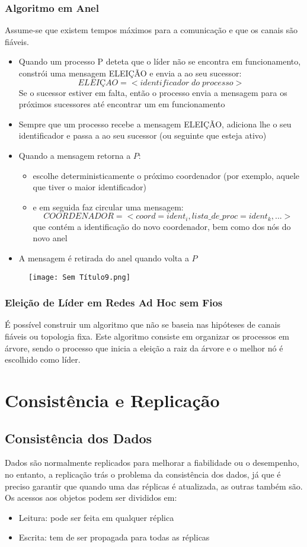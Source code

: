 \documentclass[10pt,a4paper]{report}
\begin{document}
\subsection{Algoritmo em Anel}
Assume-se que existem tempos máximos para a comunicação e que os canais são fiáveis.
\begin{itemize}
\item Quando um processo P deteta que o líder não se encontra em funcionamento, constrói uma mensagem ELEIÇÃO e envia a ao seu sucessor:
$$
ELEIÇAO = < identificador\;do\;processo >
$$
Se o sucessor estiver em falta, então o processo envia a mensagem para os próximos sucessores até encontrar um em funcionamento
\item Sempre que um processo recebe a mensagem ELEIÇÃO, adiciona lhe o seu identificador e passa a ao seu sucessor (ou seguinte que esteja ativo)
\item Quando a mensagem retorna a $P$:
\begin{itemize}
\item escolhe deterministicamente o próximo coordenador (por exemplo, aquele que tiver o maior identificador)
\item e em seguida faz circular uma mensagem:
$$
COORDENADOR = <coord=ident_i, lista\_de\_proc = ident_k,...>
$$
que contém a identificação do novo coordenador, bem como dos nós do novo anel
\end{itemize}
\item A mensagem é retirada do anel quando volta a $P$
\end{itemize}
\begin{figure}[H]
\centering
\texttt{[image: Sem Título9.png]}
\end{figure}
\subsection{Eleição de Líder em Redes Ad Hoc sem Fios}
É possível construir um algoritmo que não se baseia nas hipóteses de canais fiáveis ou topologia fixa. Este algoritmo consiste em organizar os processos em árvore, sendo o processo que inicia a eleição a raiz da árvore e o melhor nó é escolhido como líder.

\chapter{Consistência e Replicação}
\section{Consistência dos Dados}
Dados são normalmente replicados para melhorar a fiabilidade ou o desempenho, no entanto, a replicação trás o problema da consistência dos dados, já que é preciso garantir que quando uma das réplicas é atualizada, as outras também são. Os acessos aos objetos podem ser divididos em:
\begin{itemize}
\item Leitura: pode ser feita em qualquer réplica
\item Escrita: tem de ser propagada para todas as réplicas
\end{itemize}
\end{document}
